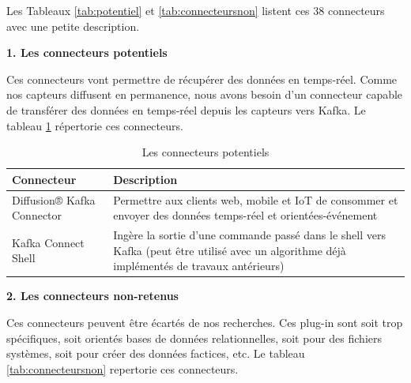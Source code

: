 \documentclass{article}
\begin{document}
			Les Tableaux \ref{tab:potentiel} et \ref{tab:connecteursnon} listent ces 38 connecteurs avec une petite description.\par
			\textbf{1. Les connecteurs potentiels}\par
			Ces connecteurs vont permettre de récupérer des données en temps-réel. 
			Comme nos capteurs diffusent en permanence, nous avons besoin d’un connecteur capable de transférer des données en temps-réel depuis les capteurs vers Kafka.
			Le tableau \ref{tab:potentiels} répertorie ces connecteurs.\par
			\begin{table}[h]
				\begin{tabular}{|p{7.5cm}|p{7.5cm}|}
					\hline
					\rowcolor{lightgray} Connecteur & Description\\\hline
					Diffusion® Kafka Connector & Permettre aux clients web, mobile et IoT de consommer et envoyer des données temps-réel et orientées-événement\\\hline
					Kafka Connect Shell & Ingère la sortie d’une commande passé dans le shell vers Kafka (peut être utilisé avec un algorithme déjà implémentés de travaux antérieurs) \\\hline
				\end{tabular}
				\caption{Les connecteurs potentiels}
				\label{tab:potentiels}
			\end{table}\par
			\textbf{2. Les connecteurs non-retenus}\par
			Ces connecteurs peuvent être écartés de nos recherches. 
			Ces plug-in sont soit trop spécifiques, soit orientés bases de données relationnelles, soit pour des fichiers systèmes, soit pour créer des données factices, etc.
			Le tableau \ref{tab:connecteursnon} repertorie ces connecteurs.
\end{document}
